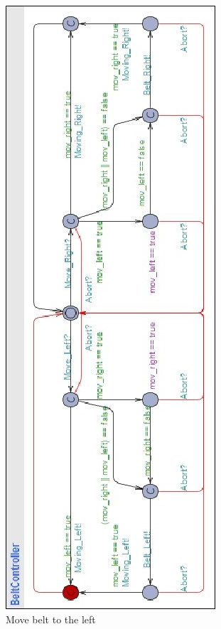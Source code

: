 \documentclass[a4paper,oneside,11pt]{report}
\begin{document}
\begin{figure}
\centering
\includegraphics[height=0.75\textheight]{images/BCTL4.jpg}
\caption{Move belt to the left}
\label{fig:bctl4}
\end{figure}
\end{document}
